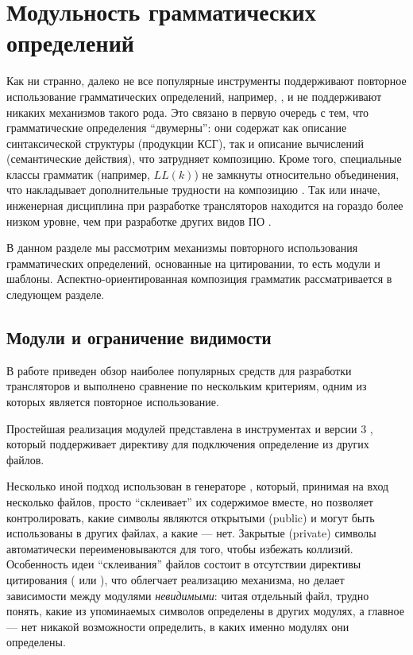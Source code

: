 \section{Модульность грамматических определений}

Как ни странно, далеко не все популярные инструменты поддерживают повторное использование грамматических определений, например,  \cite{???},  \cite{???} и  \cite{???} не поддерживают никаких механизмов такого рода. Это связано в первую очередь с тем, что грамматические определения ``двумерны'': они содержат как описание синтаксической структуры (продукции КСГ), так и описание вычислений (семантические действия), что затрудняет композицию. Кроме того, специальные классы грамматик (например, $LL(k)$) не замкнуты относительно объединения, что накладывает дополнительные трудности на композицию \cite{???}. Так или иначе, инженерная дисциплина при разработке трансляторов находится на гораздо более низком уровне, чем при разработке других видов ПО \cite{Grammarware}.

В данном разделе мы рассмотрим механизмы повторного использования грамматических определений, основанные на цитировании, то есть модули и шаблоны. Аспектно-ориентированная композиция грамматик рассматривается в следующем разделе.

\subsection{Модули и ограничение видимости} В работе \cite{SysProg-2006} приведен обзор наиболее популярных средств для разработки трансляторов и выполнено сравнение по нескольким критериям, одним из которых является повторное использование.

Простейшая реализация модулей представлена в инструментах  \cite{???} и  версии 3 \cite{???}, который поддерживает директиву  для подключения определение из других файлов. 

Несколько иной подход использован в генераторе  \cite{???}, который, принимая на вход несколько файлов, просто ``склеивает'' их содержимое вместе, но позволяет контролировать, какие символы являются открытыми (public) и могут быть использованы в других файлах, а какие --- нет. Закрытые (private) символы автоматически переименовываются для того, чтобы избежать коллизий. Особенность идеи ``склеивания'' файлов состоит в отсутствии директивы цитирования ( или ), что облегчает реализацию механизма, но делает зависимости между модулями \emph{невидимыми}: читая отдельный файл, трудно понять, какие из упоминаемых символов определены в других модулях, а главное --- нет никакой возможности определить, в каких именно модулях они определены.


